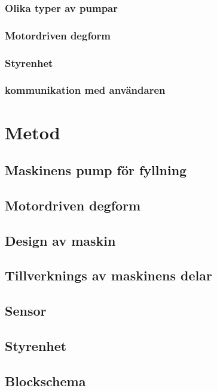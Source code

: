 \documentclass[11pt,a4paper,oneside]{book}
\begin{document}
\subsection{Olika typer av pumpar}
 
\newpage
\subsection{Motordriven degform}

\subsection{Styrenhet}

\subsection{kommunikation med användaren}


\chapter{Metod}

\section{Maskinens pump för fyllning}

\section{Motordriven degform}

\section{Design av maskin}

\section{Tillverknings av maskinens delar}

\section{Sensor}

\section{Styrenhet}

\section{Blockschema}
\end{document}

